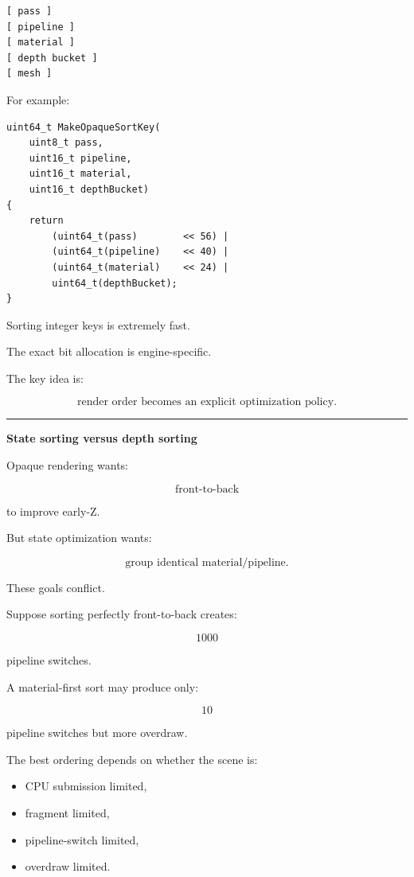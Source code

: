\begin{verbatim}
[ pass ]
[ pipeline ]
[ material ]
[ depth bucket ]
[ mesh ]
\end{verbatim}

For example:

\begin{verbatim}
uint64_t MakeOpaqueSortKey(
    uint8_t pass,
    uint16_t pipeline,
    uint16_t material,
    uint16_t depthBucket)
{
    return
        (uint64_t(pass)        << 56) |
        (uint64_t(pipeline)    << 40) |
        (uint64_t(material)    << 24) |
        uint64_t(depthBucket);
}
\end{verbatim}

Sorting integer keys is extremely fast.

The exact bit allocation is engine-specific.

The key idea is:

\[
\boxed{
\text{render order becomes an explicit optimization policy}.
}
\]

\begin{center}\rule{0.5\linewidth}{0.5pt}\end{center}

\textbf{State sorting versus depth sorting}

Opaque rendering wants:

\[
\text{front-to-back}
\]

to improve early-Z.

But state optimization wants:

\[
\text{group identical material/pipeline}.
\]

These goals conflict.

Suppose sorting perfectly front-to-back creates:

\[
1000
\]

pipeline switches.

A material-first sort may produce only:

\[
10
\]

pipeline switches but more overdraw.

The best ordering depends on whether the scene is:

\begin{itemize}
\tightlist
\item
  CPU submission limited,
\item
  fragment limited,
\item
  pipeline-switch limited,
\item
  overdraw limited.
\end{itemize}

